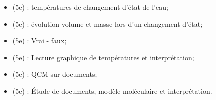 \documentclass[12pt,a4paper]{article}
\begin{document}
\begin{myexos}
	\begin{itemize}
		
		\item {} (5e) : températures de changement d'état de l'eau;
		\item {} (5e) : évolution volume et masse lors d'un changement d'état;
		\item {} (5e) : Vrai - faux;
		\item {} (5e) : Lecture graphique de températures et interprétation;
		\item {} (5e) : QCM sur documents;
		\item {} (5e) : \'Etude de documents, modèle moléculaire et interprétation.
	\end{itemize}
\end{myexos}



\appendix

\end{document}
